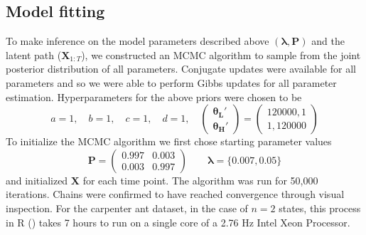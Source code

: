 \documentclass[cmbright,fleqn,referee]{envauth}
\begin{document}
\subsection{Model fitting}
To make inference on the model parameters described above $( \mathbf{\lambda}, \mathbf{P})$ and the latent path ($\mathbf{X}_{1:T}$), we constructed an MCMC algorithm to sample from the joint posterior distribution of all parameters. Conjugate updates were available for all parameters and so we were able to perform Gibbs updates for all parameter estimation. Hyperparameters for the above priors were chosen to be
 \begin{equation}
 a = 1,\quad
 b = 1,\quad
 c = 1, \quad
 d = 1, \quad
 \begin{pmatrix}
 \bm{\theta_L'}\\
 \bm{\theta_H'}
 \end{pmatrix} = \begin{pmatrix}
 120000, 1 \\
 1, 120000 
 \end{pmatrix}
 \end{equation} 
 To initialize the MCMC algorithm we first chose starting parameter values
 \begin{equation}
 \bm{P} = \begin{pmatrix}
 0.997 & 0.003 \\
 0.003 & 0.997
 \end{pmatrix}\qquad \bm{\lambda} = \{0.007, 0.05\}
 \end{equation}
 and initialized $\mathbf{X}$ for each time point. The algorithm was run for 50,000 iterations. 
 Chains were confirmed to have reached convergence through visual inspection. For the carpenter ant dataset, in the case of $n = 2$ states, this process in R (\cite{RCoreTeam2016}) takes 7 hours to run on a single core of a 2.76 Hz Intel Xeon Processor. 
\end{document}
